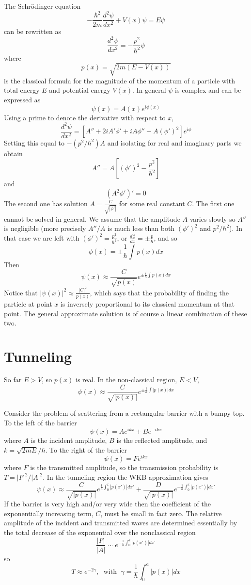 \documentclass[12pt, a4paper, oneside, openright, titlepage]{book}
\begin{document}
The Schr\"{o}dinger equation $$-\frac{\hbar^2}{2m}\frac{d^2\psi}{dx^2}+V(x)\psi= E\psi$$
can be rewritten as $$\frac{d^2\psi}{dx^2} = -\frac{p^2}{\hbar^2}\psi$$
where $$p(x) = \sqrt{2m(E-V(x))}$$
is the classical formula for the magnitude of the momentum of a particle with total energy $E$ and potential energy $V(x)$. In general $\psi$ is complex and can be expressed as $$\psi(x) = A(x)e^{i\phi(x)}$$
Using a prime to denote the derivative with respect to $x$, $$\frac{d^2\psi}{dx^2} = \left[A''+2iA'\phi'+iA\phi''-A(\phi')^2\right]e^{i\phi}$$
Setting this equal to $-(p^2/\hbar^2)A$ and isolating for real and imaginary parts we obtain $$A'' = A\left[(\phi')^2-\frac{p^2}{\hbar^2}\right]$$
and $$(A^2\phi')' = 0$$
The second one has solution $A = \frac{C}{\sqrt{|\phi'|}}$ for some real constant $C$. The first one cannot be solved in general. We assume that the amplitude $A$ varies slowly so $A''$ is negligible (more precisely $A''/A$ is much less than both $(\phi')^2$ and $p^2/\hbar^2$). In that case we are left with $(\phi')^2 = \frac{p^2}{\hbar^2}$, or $\frac{d\phi}{dx} = \pm\frac{p}{\hbar}$, and so $$\phi(x) = \pm\frac{1}{\hbar}\int p(x)dx$$
Then $$\psi(x) \approx \frac{C}{\sqrt{p(x)}}e^{\pm\frac{i}{\hbar}\int p(x)dx}$$
Notice that $|\psi(x)|^2 \approx \frac{|C|^2}{p(x)}$, which says that the probability of finding the particle at point $x$ is inversely proportional to its classical momentum at that point. The general approximate solution is of course a linear combination of these two.


\section{Tunneling}

So far $E > V$, so $p(x)$ is real. In the non-classical region, $E < V$, $$\psi(x) \approx \frac{C}{\sqrt{|p(x)|}}e^{\pm\frac{1}{\hbar}\int|p(x)|dx}$$

Consider the problem of scattering from a rectangular barrier with a bumpy top. To the left of the barrier $$\psi(x) = Ae^{ikx}+Be^{-ikx}$$
where $A$ is the incident amplitude, $B$ is the reflected amplitude, and $k = \sqrt{2mE}/\hbar$. To the right of the barrier $$\psi(x) = Fe^{ikx}$$
where $F$ is the transmitted amplitude, so the transmission probability is $T = |F|^2/|A|^2$. In the tunneling region the WKB approximation gives $$\psi(x) \approx \frac{C}{\sqrt{|p(x)|}}e^{\frac{1}{\hbar}\int_0^x|p(x')|dx'}+\frac{D}{\sqrt{|p(x)|}}e^{-\frac{1}{\hbar}\int_0^x|p(x')|dx'}$$
If the barrier is very high and/or very wide then the coefficient of the exponentially increasing term, $C$, must be small in fact zero. The relative amplitude of the incident and transmitted waves are determined essentially by the total decrease of the exponential over the nonclassical region $$\frac{|F|}{|A|} \sim e^{-\frac{1}{\hbar}\int_0^a|p(x')|dx'}$$
so $$T \approx e^{-2\gamma},\;\text{ with }\;\gamma = \frac{1}{\hbar}\int_0^a|p(x)|dx$$
\end{document}

